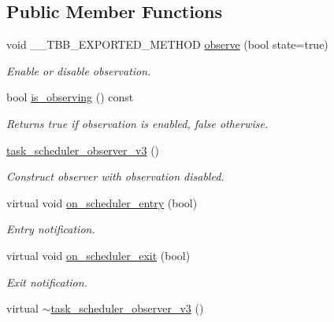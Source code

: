 \subsection*{Public Member Functions}
\begin{DoxyCompactItemize}
\item 
void \+\_\+\+\_\+\+T\+B\+B\+\_\+\+E\+X\+P\+O\+R\+T\+E\+D\+\_\+\+M\+E\+T\+H\+O\+D \hyperlink{classtbb_1_1internal_1_1task__scheduler__observer__v3_a40209b347e3c82bb5bfda05941304309}{observe} (bool state=true)
\begin{DoxyCompactList}\small\item\em Enable or disable observation. \end{DoxyCompactList}\item 
\hypertarget{classtbb_1_1internal_1_1task__scheduler__observer__v3_a31abaf256f7172f010cfb2259c7787bb}{}bool \hyperlink{classtbb_1_1internal_1_1task__scheduler__observer__v3_a31abaf256f7172f010cfb2259c7787bb}{is\+\_\+observing} () const \label{classtbb_1_1internal_1_1task__scheduler__observer__v3_a31abaf256f7172f010cfb2259c7787bb}

\begin{DoxyCompactList}\small\item\em Returns true if observation is enabled, false otherwise. \end{DoxyCompactList}\item 
\hypertarget{classtbb_1_1internal_1_1task__scheduler__observer__v3_a25bffb05efaaab36bc58590969e29745}{}\hyperlink{classtbb_1_1internal_1_1task__scheduler__observer__v3_a25bffb05efaaab36bc58590969e29745}{task\+\_\+scheduler\+\_\+observer\+\_\+v3} ()\label{classtbb_1_1internal_1_1task__scheduler__observer__v3_a25bffb05efaaab36bc58590969e29745}

\begin{DoxyCompactList}\small\item\em Construct observer with observation disabled. \end{DoxyCompactList}\item 
virtual void \hyperlink{classtbb_1_1internal_1_1task__scheduler__observer__v3_af4282a27725fbe86052bb785bdd9c5d3}{on\+\_\+scheduler\+\_\+entry} (bool)
\begin{DoxyCompactList}\small\item\em Entry notification. \end{DoxyCompactList}\item 
virtual void \hyperlink{classtbb_1_1internal_1_1task__scheduler__observer__v3_a657e90f833568e217b807d0122fa7668}{on\+\_\+scheduler\+\_\+exit} (bool)
\begin{DoxyCompactList}\small\item\em Exit notification. \end{DoxyCompactList}\item 
\hypertarget{classtbb_1_1internal_1_1task__scheduler__observer__v3_a151e475ebba39172fcc13f43bed426cc}{}virtual \hyperlink{classtbb_1_1internal_1_1task__scheduler__observer__v3_a151e475ebba39172fcc13f43bed426cc}{$\sim$task\+\_\+scheduler\+\_\+observer\+\_\+v3} ()\label{classtbb_1_1internal_1_1task__scheduler__observer__v3_a151e475ebba39172fcc13f43bed426cc}


\end{DoxyCompactItemize}
